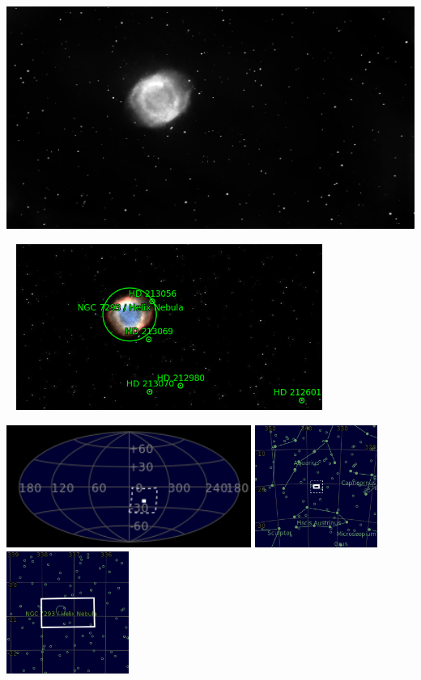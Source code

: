 {\footnotesize\color{white}


}\ \\
\includegraphics[width=\textwidth]{../Imaging//Grayscale/Helix_Nebula.jpg}
\begin{center}
 \ \newpage
\includegraphics[width=0.75\textwidth]{../Imaging//Annotated/Helix_Nebula_Annotated.jpg}

\includegraphics[height=4cm]{../Imaging//Annotated/Helix_Nebula_Globe.jpg}
\includegraphics[height=4cm]{../Imaging//Annotated/Helix_Nebula_Close.jpg}
\includegraphics[height=4cm]{../Imaging//Annotated/Helix_Nebula_Closer.jpg}
\end{center}
